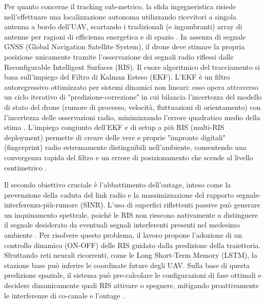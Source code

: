 \documentclass[twoside]{article}
\begin{document}
Per quanto concerne il tracking sub-metrico, la sfida ingegneristica risiede nell'effettuare una localizzazione autonoma utilizzando ricevitori a singola antenna a bordo dell'UAV, scartando i tradizionali (e ingombranti) array di antenne per ragioni di efficienza energetica e di spazio \cite{Ye2023}. In assenza di segnale GNSS (Global Navigation Satellite System), il drone deve stimare la propria posizione unicamente tramite l'osservazione dei segnali radio riflessi dalle Reconfigurable Intelligent Surfaces (RIS). Il cuore algoritmico del tracciamento si basa sull'impiego del Filtro di Kalman Esteso (EKF). L'EKF è un filtro autoregressivo ottimizzato per sistemi dinamici non lineari: esso opera attraverso un ciclo iterativo di "predizione-correzione" in cui bilancia l'incertezza del modello di stato del drone (rumore di processo, velocità, fluttuazioni di orientamento) con l'incertezza delle osservazioni radio, minimizzando l'errore quadratico medio della stima \cite{Muller2024,Ye2023}. L'impiego congiunto dell'EKF e di setup a più RIS (multi-RIS deployment) permette di creare delle vere e proprie "impronte digitali" (fingerprint) radio estremamente distinguibili nell'ambiente, consentendo una convergenza rapida del filtro e un errore di posizionamento che scende al livello centimetrico \cite{Ye2023}.

Il secondo obiettivo cruciale è l'abbattimento dell'outage, inteso come la prevenzione della caduta del link radio e la massimizzazione del rapporto segnale-interferenza-più-rumore (SINR). L'uso di superfici riflettenti passive può generare un inquinamento spettrale, poiché le RIS non riescono nativamente a distinguere il segnale desiderato da eventuali segnali interferenti presenti nel medesimo ambiente \cite{Wang2024}. Per risolvere questo problema, il lavoro propone l'adozione di un controllo dinamico (ON-OFF) delle RIS guidato dalla predizione della traiettoria. Sfruttando reti neurali ricorrenti, come le Long Short-Term Memory (LSTM), la stazione base può inferire le coordinate future degli UAV. Sulla base di questa predizione spaziale, il sistema può pre-calcolare le configurazioni di fase ottimali e decidere dinamicamente quali RIS attivare o spegnere, mitigando proattivamente le interferenze di co-canale e l'outage \cite{Wang2024}.
\end{document}
